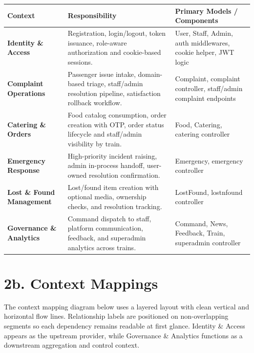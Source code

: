 \documentclass[12pt,a4paper]{report}
\renewcommand{\toprule}{\hline\hline}
\renewcommand{\midrule}{\hline}
\renewcommand{\bottomrule}{\hline\hline}
\begin{document}
\begin{table}[H]
\centering
\begin{tabularx}{\textwidth}{>{\bfseries}p{}Y Y}
\toprule
{}
\textcolor{TableHeaderText}{Context} & \textcolor{TableHeaderText}{Responsibility} & \textcolor{TableHeaderText}{Primary Models / Components} \\
\midrule
Identity \& Access & Registration, login/logout, token issuance, role-aware authorization and cookie-based sessions. & User, Staff, Admin, auth middlewares, cookie helper, JWT logic \\
Complaint Operations & Passenger issue intake, domain-based triage, staff/admin resolution pipeline, satisfaction rollback workflow. & Complaint, complaint controller, staff/admin complaint endpoints \\
Catering \& Orders & Food catalog consumption, order creation with OTP, order status lifecycle and staff/admin visibility by train. & Food, Catering, catering controller \\
Emergency Response & High-priority incident raising, admin in-process handoff, user-owned resolution confirmation. & Emergency, emergency controller \\
Lost \& Found Management & Lost/found item creation with optional media, ownership checks, and resolution tracking. & LostFound, lostnfound controller \\
Governance \& Analytics & Command dispatch to staff, platform communication, feedback, and superadmin analytics across trains. & Command, News, Feedback, Train, superadmin controller \\
\bottomrule
\end{tabularx}
\end{table}

\section{2b. Context Mappings}

The context mapping diagram below uses a layered layout with clean vertical and horizontal flow lines. Relationship labels are positioned on non-overlapping segments so each dependency remains readable at first glance. Identity \& Access appears as the upstream provider, while Governance \& Analytics functions as a downstream aggregation and control context.
\end{document}

